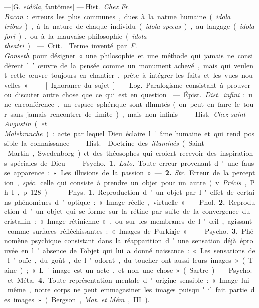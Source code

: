 \begin{itemize}[leftmargin=1cm, label=, itemsep=1pt]
 —[G. {\it eidôla}, fantômes] — \si{Hist.} {\it Chez Fr. Bacon} :
erreurs les plus communes, dues à la nature humaine ({\it idola tribus}), à
la nature de chaque individu ({\it idola specus}), au langage ({\it idola
fori}), ou à la mauvaise philosophie ({\it idola theatri}).

 — \si{Crit.}  Terme inventé par {\it F.
Gonseth} pour désigner « une philosophie et une méthode qui jamais ne
considèrent l’œuvre de la pensée comme un monument achevé, mais qui veulent
cette œuvre toujours en chantier, prête à intégrer les faits et les vues
nouvelles ».

 — [Ignorance du sujet] — \si{Log.} Paralogisme
consistant à prouver ou discuter autre chose que ce qui est en question.

 — \si{Épist.} {\it Dist.} {\it infini} : une circonférence, un
espace sphérique sont illimités (on peut en faire le tour sans jamais
rencontrer de limite), mais non infinis.

 — \si{Hist.} {\it Chez saint Augustin} ({\it et
Malebranche}) : acte par lequel Dieu éclaire l'âme humaine et qui rend
possible la connaissance.

 — \si{Hist.}  Doctrine des {\it illuminés}
(Saint-Martin, Swedenborg) et des théosophes qui croient recevoir des
inspirations spéciales de Dieu.

 — \si{Psycho.} {\bf 1.} {\it Lato.} Toute erreur provenant
d’une fausse apparence : « Les illusions de la passion ». — {\bf 2.}
{\it Str.} Erreur de la perception, {\it spéc.} celle qui consiste à prendre
un objet pour un autre (v. {\it Précis}, Ph. I, p. 128).

 —  \si{Phys.} {\bf 1.} Reproduction d'un objet par
l'effet de certains phénomènes d’optique : « Image réelle, virtuelle ». —
\si{Phol.} {\bf 2.} Reproduction d’un objet qui se forme sur la rétine par
suite de la convergence du cristallin : « Image rétinienne », ou sur les
membranes de l'œil, agissant comme surfaces réfléchissantes : « Images de
Purkinje ».

—  \si{Psycho.} {\bf 3.} Phénomène psychique consistant dans
la réapparition d’une sensation déjà éprouvée en l'absence de Fobjet qui lui
a donné naissance : « Les sensations de l’ouïe, du goût, de l’odorat, du
toucher ont aussi leurs images » (Taine); « L'image est un acte, et non une
chose » (Sartre). — \si{Psycho.} et \si{Méta.} {\bf 4.} Toute représentation
mentale d’origine sensible : « Image lui-même, notre corps ne peut
emmagasiner les images puisqu'il fait partie des images » (Bergson, {\it Mat.
et Mém}, III).


\end{itemize}
